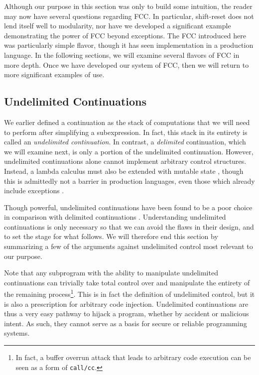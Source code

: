 \documentclass[11pt]{article}
\newcommand{\maybePage}{\newpage}
\begin{document}
Although our purpose in this section was only to build some intuition, the reader may now have several questions regarding FCC.
In particular, shift-reset does not lend itself well to modularity, nor have we developed a significant example demonstrating the power of FCC beyond exceptions.
The FCC introduced here was particularly simple flavor, though it has seen implementation in a production language.
In the following sections, we will examine several flavors of FCC in more depth.
Once we have developed our system of FCC, then we will return to more significant examples of use.


\maybePage
\subsection{Undelimited Continuations}
\label{undelimControl}

We earlier defined a continuation as the stack of computations that we will need to perform after simplifying a subexpression.
In fact, this stack in its entirety is called an \emph{undelimited continuation}.
In contrast, a \emph{delimited} continuation, which we will examine next, is only a portion of the undelimited continuation.
However, undelimited continuations alone cannot implement arbitrary control structures.
Instead, a lambda calculus must also be extended with mutable state \cite{Filinski94}, though this is admittedly not a barrier in production languages, even those which already include exceptions \cite{GreatEscape}.

Though powerful, undelimited continuations have been found to be a poor choice in comparison with delimited continuations \cite{MFDC}\cite{continuationsInProcObjs}\cite{HandlingControl}\cite{Sitaram90}.
Understanding undelimited continuations is only necessary so that we can avoid the flaws in their design, and to set the stage for what follows.
We will therefore end this section by summarizing a few of the arguments against undelimited control most relevant to our purpose.

Note that any subprogram with the ability to manipulate undelimited continuations can trivially take total control over and manipulate the entirety of the remaining process\footnote{In fact, a buffer overrun attack that leads to arbitrary code execution can be seen as a form of \texttt{call/cc}.}.
This is in fact the definition of undelimited control, but it is also a prescription for arbitrary code injection.
Undelimited continuations are thus a very easy pathway to hijack a program, whether by accident or malicious intent.
As such, they cannot serve as a basis for secure or reliable programming systems.
\end{document}
